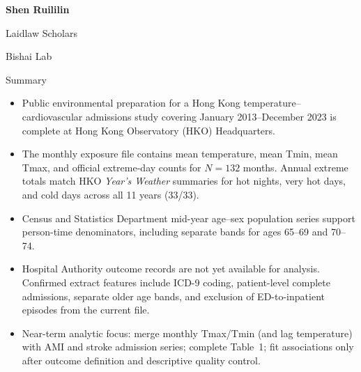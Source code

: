 \documentclass[aspectratio=169,10pt]{beamer}
\begin{document}
\begin{frame}[plain]
  \vspace{2.6cm}
  \begin{center}
    {\LARGE\bfseries Shen Ruililin\par}
    \vspace{1.1em}
    {\large Laidlaw Scholars\par}
    \vspace{0.55em}
    {\large Bishai Lab\par}
  \end{center}
\end{frame}

\begin{frame}{Summary}
  \begin{itemize}
    \item Public environmental preparation for a Hong Kong temperature--cardiovascular admissions study covering January 2013--December 2023 is complete at Hong Kong Observatory (HKO) Headquarters.
    \item The monthly exposure file contains mean temperature, mean Tmin, mean Tmax, and official extreme-day counts for $N=132$ months. Annual extreme totals match HKO \textit{Year's Weather} summaries for hot nights, very hot days, and cold days across all 11 years (33/33).
    \item Census and Statistics Department mid-year age--sex population series support person-time denominators, including separate bands for ages 65--69 and 70--74.
    \item Hospital Authority outcome records are not yet available for analysis. Confirmed extract features include ICD-9 coding, patient-level complete admissions, separate older age bands, and exclusion of ED-to-inpatient episodes from the current file.
    \item Near-term analytic focus: merge monthly Tmax/Tmin (and lag temperature) with AMI and stroke admission series; complete Table~1; fit associations only after outcome definition and descriptive quality control.
  \end{itemize}
\end{frame}
\end{document}

